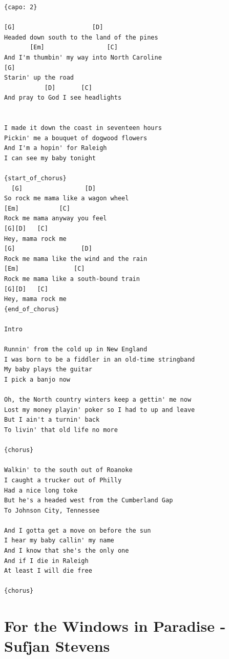 \documentclass[
]{book}
\let\stdsection\section
\renewcommand\section{\clearpage\stdsection}
\begin{document}
\begin{verbatim}
{capo: 2}

[G]                     [D]
Headed down south to the land of the pines
       [Em]                 [C]
And I'm thumbin' my way into North Caroline
[G]
Starin' up the road
           [D]       [C]
And pray to God I see headlights


I made it down the coast in seventeen hours 
Pickin' me a bouquet of dogwood flowers 
And I'm a hopin' for Raleigh 
I can see my baby tonight

{start_of_chorus}
  [G]                 [D]
So rock me mama like a wagon wheel
[Em]           [C]
Rock me mama anyway you feel
[G][D]   [C]
Hey, mama rock me
[G]                  [D]
Rock me mama like the wind and the rain
[Em]               [C]
Rock me mama like a south-bound train
[G][D]   [C]
Hey, mama rock me
{end_of_chorus}

Intro

Runnin' from the cold up in New England
I was born to be a fiddler in an old-time stringband
My baby plays the guitar
I pick a banjo now

Oh, the North country winters keep a gettin' me now
Lost my money playin' poker so I had to up and leave
But I ain't a turnin' back
To livin' that old life no more

{chorus}

Walkin' to the south out of Roanoke
I caught a trucker out of Philly
Had a nice long toke
But he's a headed west from the Cumberland Gap
To Johnson City, Tennessee

And I gotta get a move on before the sun
I hear my baby callin' my name
And I know that she's the only one
And if I die in Raleigh
At least I will die free

{chorus}
\end{verbatim}

\hypertarget{for-the-windows-in-paradise---sufjan-stevens}{%
\section{For the Windows in Paradise - Sufjan Stevens}\label{for-the-windows-in-paradise---sufjan-stevens}}
\end{document}
